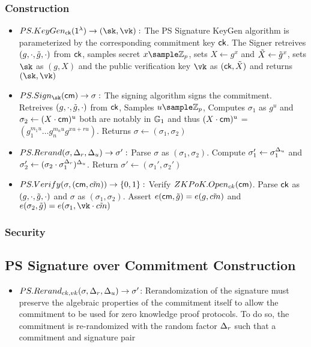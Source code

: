\subsubsection{Construction}
\begin{itemize}
    \item $PS.KeyGen_{\ck}(\secparam) \to (\sk, \vk):$ The PS Signature KeyGen algorithm is parameterized by the corresponding commitment key $\mathsf{ck}$. The Signer retreives $(g, \cdot, \tilde{g}, \cdot)$ from $\mathsf{ck}$, samples secret $x \sample \Zp$, sets $X \gets g^x$ and $\tilde{X} \gets \tilde{g}^x$, sets $\sk$ as $(g, X)$ and the public verification key $\vk$ as $(\mathsf{ck}, \tilde{X})$ and returns $(\sk, \vk)$

    \item $PS.Sign_{\sk}(\cm) \to \sigma: $ The signing algorithm signs the commitment. Retreives $(g, \cdot, \tilde{g}, \cdot)$ from $\mathsf{ck}$, Samples $u \sample \Zp$, Computes $\sigma_1$ as $g^u$ and $\sigma_2 \gets (X \cdot \mathsf{cm})^u$ both are notably in $\mathbb{G}_1$ and thus $(X \cdot \mathsf{cm})^u$ = $(g_1^{m_1u}\dots g_n^{m_nu}g^{xu+ru})$. Returns $\sigma \gets (\sigma_1, \sigma_2)$    

    \item $PS.Rerand(\sigma, \Delta_r, \Delta_u) \to \sigma':$ Parse $\sigma$ as $(\sigma_1, \sigma_2)$. Compute $\sigma_1' \gets \sigma_1^{\Delta_u}$ and $\sigma_2' \gets (\sigma_2 \cdot \sigma_1^{\Delta_r})^{\Delta_u}$. Return $\sigma' \gets (\sigma_1', \sigma_2')$

    \item $PS.Verify(\sigma, (\mathsf{cm}, \tilde{cm})) \to \{0,1\}:$ Verify $ZKPoK.Open_{ck}(\mathsf{cm})$. Parse $\mathsf{ck}$ as $(g, \cdot, \tilde{g}, \cdot)$ and $\sigma$ as $(\sigma_1, \sigma_2)$. Assert $e(\mathsf{cm}, \tilde{g}) = e(g, \tilde{cm})$ and $e(\sigma_2, \tilg) = e(\sigma_1, \vk \cdot \tilcm)$

\end{itemize}

\subsubsection{Security}


\subsection{PS Signature over Commitment Construction}
\begin{itemize}
    \item $PS.Rerand_{ck,vk}(\sigma, \Delta_r, \Delta_u) \to \sigma'$: Rerandomization of the signature must preserve the algebraic properties of the commitment itself to allow the commitment to be used for zero knowledge proof protocols. To do so, the commitment is re-randomized with the random factor $\Delta_r$ such that a commitment and signature pair 

\end{itemize}






